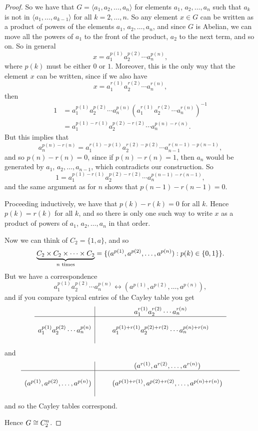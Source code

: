 \begin{proof}
  So we have that $G = \langle a_{1}, a_{2}, \ldots, a_{n} \rangle$ for elements
  $a_{1}$, $a_{2}, \ldots, a_{n}$ such that $a_{k}$ is not in $\langle a_{1}, \ldots, a_{k-1} \rangle$ for
  all $k = 2, \ldots, n$.  So any element $x \in G$ can be written as a product
  of powers of the elements $a_{1}$, $a_{2}, \ldots, a_{n}$, and since $G$
  is Abelian, we can move all the powers of $a_{1}$ to the front of the
  product, $a_{2}$ to the next term, and so on.  So in general
  \[
    x = a_{1}^{p(1)}a_{2}^{p(2)}\cdots a_{n}^{p(n)},
  \]
  where $p(k)$ must be either $0$ or $1$.  Moreover, this is the only way that
  the element $x$ can be written, since if we also have
  \[
    x = a_{1}^{r(1)}a_{2}^{r(2)}\cdots a_{n}^{r(n)},
  \]
  then
  \begin{align*}
    1 &= a_{1}^{p(1)}a_{2}^{p(2)}\cdots a_{n}^{p(n)}(a_{1}^{r(1)}a_{2}^{r(2)}\cdots a_{n}^{r(n)})^{-1}\\
      &= a_{1}^{p(1) - r(1)}a_{2}^{p(2) - r(2)}\cdots a_{n}^{p(n) - r(n)}.
  \end{align*}
  But this implies that
  \[
    a_{n}^{p(n) - r(n)} = a_{1}^{r(1) - p(1)}a_{2}^{r(2) - p(2)}\cdots a_{n-1}^{r(n-1) - p(n-1)},
  \]
  and so $p(n) - r(n) = 0$, since if $p(n) - r(n) = 1$, then $a_{n}$ would be
  generated by $a_{1}$, $a_{2}, \ldots, a_{n-1}$, which contradicts our
  construction.  So
  \[
    1 = a_{1}^{p(1) - r(1)}a_{2}^{p(2) - r(2)}\cdots a_{n}^{p(n-1) - r(n-1)},
  \]
  and the same argument as for $n$ shows that $p(n-1) - r(n-1) = 0$.
  
  Proceeding inductively, we have that $p(k) - r(k) = 0$ for all $k$.  Hence
  $p(k) = r(k)$ for all $k$, and so there is only one such way to write $x$
  as a product of powers of $a_{1}$, $a_{2}, \ldots, a_{n}$ in that order.
  
  Now we can think of $C_{2} = \{1, a\}$, and so
  \[
    \underbrace{C_{2} \times C_{2} \times \cdots \times C_{2}}_{\text{$n$ times}}
    = \{ (a^{p(1)}, a^{p(2)}, \ldots, a^{p(n)}) : p(k) \in \{0, 1\}\}.
  \]
  But we have a correspondence
  \[
    a_{1}^{p(1)}a_{2}^{p(2)}\cdots a_{n}^{p(n)} \leftrightarrow
    (a^{p(1)}, a^{p(2)}, \ldots, a^{p(n)}),
  \]
  and if you compare typical entries of the Cayley table you get
  \[
    \begin{array}{c|ccc}
      & \quad & a_{1}^{r(1)}a_{2}^{r(2)}\cdots a_{n}^{r(n)} & \quad \\
      \hline
      \\
    a_{1}^{p(1)}a_{2}^{p(2)}\cdots a_{n}^{p(n)} &&
       a_{1}^{p(1) + r(1)}a_{2}^{p(2) + r(2)}\cdots a_{n}^{p(n) + r(n)} \\
       &
    \end{array}
  \]
  and
  \[
    \begin{array}{c|ccc}
      & \quad & (a^{r(1)}, a^{r(2)}, \ldots, a^{r(n)}) & \quad \\
      \hline
      \\
    (a^{p(1)}, a^{p(2)}, \ldots, a^{p(n)}) &&
       (a^{p(1)+r(1)}, a^{p(2)+r(2)}, \ldots, a^{p(n)+r(n)}) \\
       &
    \end{array}
  \]
  and so the Cayley tables correspond.
  
  Hence $G \cong C_{2}^{n}$.
\end{proof}
